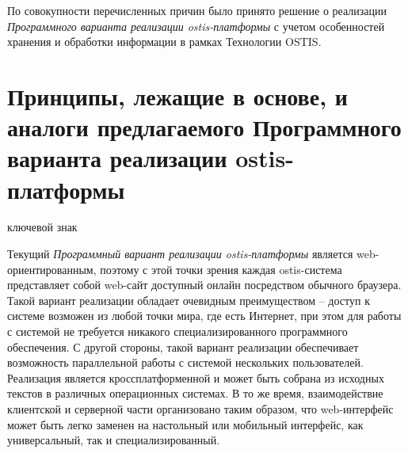 По совокупности перечисленных причин было принято решение о реализации \textit{Программного варианта реализации ostis-платформы}  с учетом особенностей хранения и обработки информации в рамках Технологии OSTIS.

\section{Принципы, лежащие в основе, и аналоги предлагаемого Программного варианта реализации ostis-платформы}
\label{sec_soft_platform_description}

\begin{SCn}

\begin{scnrelfromlist}{ключевой знак}
\end{scnrelfromlist}

\end{SCn}

\bigskip

Текущий \textit{Программный вариант реализации ostis-платформы} является web-ориентированным, поэтому с этой точки зрения каждая \mbox{ostis-система} представляет собой web-сайт доступный онлайн посредством обычного браузера. Такой вариант реализации обладает очевидным преимуществом -- доступ к системе возможен из любой точки мира, где есть Интернет, при этом для работы с системой не требуется никакого специализированного программного обеспечения. С другой стороны, такой вариант реализации обеспечивает возможность параллельной работы с системой нескольких пользователей. Реализация является кроссплатформенной и может быть собрана из исходных текстов в различных операционных системах. В то же время, взаимодействие клиентской и серверной части организовано таким образом, что \mbox{web-интерфейс} может быть легко заменен на настольный или мобильный интерфейс, как универсальный, так и специализированный.

